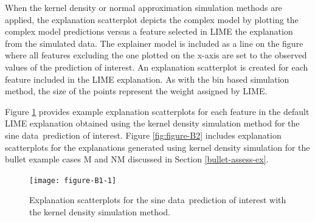\documentclass[AMS,STIX2COL]{WileyNJD-v2}\usepackage[]{graphicx}\usepackage[]{color}
\newenvironment{knitrout}{}{} %
\newcommand{\data}{sine data}
\begin{document}
When the kernel density or normal approximation simulation methods are applied, the explanation scatterplot depicts the complex model by plotting the complex model predictions versus a feature selected in LIME the explanation from the simulated data. The explainer model is included as a line on the figure where all features excluding the one plotted on the x-axis are set to the observed values of the prediction of interest. An explanation scatterplot is created for each feature included in the LIME explanation. As with the bin based simulation method, the size of the points represent the weight assigned by LIME.

Figure \ref{fig:figure-B1} provides example explanation scatterplots for each feature in the default LIME explanation obtained using the kernel density simulation method for the \data \ prediction of interest. Figure \ref{fig:figure-B2} includes explanation scatterplots for the explanations generated using kernel density simulation for the bullet example cases M and NM discussed in Section \ref{bullet-assess-ex}.

\begin{figure}[!thp]
\begin{knitrout}
\color{fgcolor}

{\centering \texttt{[image: figure-B1-1]} 

}



\end{knitrout}
\caption{Explanation scatterplots for the \data \ prediction of interest with the kernel density simulation method.}
\label{fig:figure-B1}
\end{figure}
\end{document}
